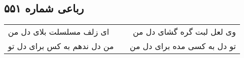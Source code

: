 \begin{center}
\section*{رباعی شماره ۵۵۱}
\label{sec:sh551}
\begin{longtable}{l p{0.5cm} r}
ای زلف مسلسلت بلای دل من
&&
وی لعل لبت گره گشای دل من
\\
من دل ندهم به کس برای دل تو
&&
تو دل به کسی مده برای دل من
\\
\end{longtable}
\end{center}
